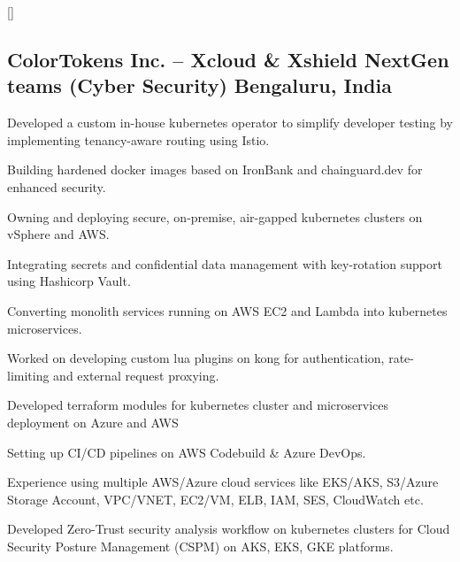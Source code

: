 \documentclass[letter,10pt]{article}
\begin{document}
\titlespacing*{\subsubsection}{0em}{0em}{0em}
\titleformat{\subsubsection}{\itshape}{}{0em}{}[]


\subsection{ColorTokens Inc. -- Xcloud \& Xshield NextGen teams (Cyber Security) \hfill Bengaluru, India}
\begin{zitemize}
    \item Developed a custom in-house kubernetes operator to simplify developer testing by implementing tenancy-aware routing using Istio.
    \item Building hardened docker images based on IronBank and chainguard.dev for enhanced security.
    \item Owning and deploying secure, on-premise, air-gapped kubernetes clusters on vSphere and AWS.
    \item Integrating secrets and confidential data management with key-rotation support using Hashicorp Vault.
    \item Converting monolith services running on AWS EC2 and Lambda into kubernetes microservices.
    \item Worked on developing custom lua plugins on kong for authentication, rate-limiting and external request proxying.
    \item Developed terraform modules for kubernetes cluster and microservices deployment on Azure and AWS
    \item Setting up CI/CD pipelines on AWS Codebuild \& Azure DevOps.
    \item Experience using multiple AWS/Azure cloud services like EKS/AKS, S3/Azure Storage Account, VPC/VNET, EC2/VM, ELB, IAM, SES, CloudWatch etc.
    \item Developed Zero-Trust security analysis workflow on kubernetes clusters for Cloud Security Posture Management (CSPM) on AKS, EKS, GKE platforms.
\end{zitemize}

\end{document}
